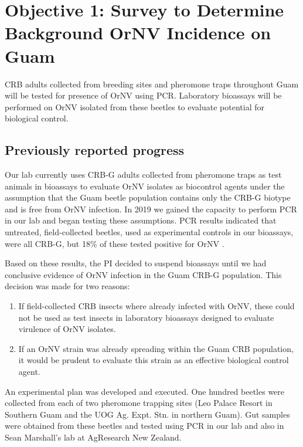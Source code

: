 \documentclass[12pt,letterpaper,english,bibliography=totocnumbered, abstract=on]{scrartcl}
\begin{document}
\clearpage

\section{Objective 1: Survey to Determine Background OrNV Incidence on Guam} 

\begin{framed}
CRB adults collected from breeding sites and pheromone traps throughout Guam will be tested for presence of OrNV using PCR.  Laboratory bioassays will be performed on OrNV isolated from these beetles to evaluate potential for biological control. 
\end{framed} 

\subsection{Previously reported progress}

Our lab currently uses CRB-G adults collected from pheromone traps as test animals in bioassays to evaluate OrNV isolates as biocontrol agents under the assumption that the Guam beetle population contains only the CRB-G biotype and is free from OrNV infection. In 2019 we gained the capacity to perform PCR in our lab and began testing these assumptions. PCR results indicated that untreated, field-collected beetles, used as experimental controls in our bioassays, were all CRB-G, but 18\% of these tested positive for OrNV \cite{graselaTechnicalReportPolymerase2020, graselaTechnicalReportPolymerase2020a}.

Based on these results, the PI decided to suspend bioassays until we had conclusive evidence of OrNV infection in the Guam CRB-G population.  This decision was made for two reasons:

\begin{enumerate}
	\item If field-collected CRB insects where already infected with OrNV, these could not be used as test insects in laboratory bioassays designed to evaluate virulence of OrNV isolates.
	\item If an OrNV strain was already spreading within the Guam CRB population, it would be prudent to evaluate this strain as an effective biological control agent. 
\end{enumerate}

An experimental plan \cite{mooreExperimentalPlanDetermining2020} was developed and executed. One hundred beetles were collected from each of two pheromone trapping sites (Leo Palace Resort in Southern Guam and the UOG Ag. Expt. Stn. in northern Guam). Gut samples were obtained from these beetles and tested using PCR in our lab and also in Sean Marshall's lab at AgResearch New Zealand. 
\end{document}
